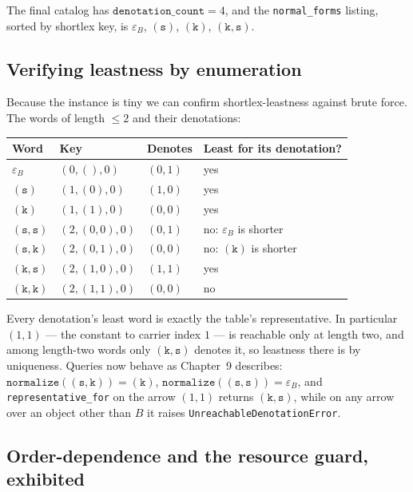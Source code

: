 The final catalog has $\texttt{denotation\_count} = 4$, and the
\texttt{normal\_forms} listing, sorted by shortlex key, is
$\varepsilon_B$, $(\texttt{s})$, $(\texttt{k})$,
$(\texttt{k},\texttt{s})$.

\subsection{Verifying leastness by enumeration}

Because the instance is tiny we can confirm shortlex-leastness against
brute force. The words of length $\le 2$ and their denotations:

\begin{center}
\begin{tabular}{@{}llll@{}}
\toprule
Word & Key & Denotes & Least for its denotation? \\
\midrule
$\varepsilon_B$ & $(0,(),0)$ & $(0,1)$ & yes \\
$(\texttt{s})$ & $(1,(0),0)$ & $(1,0)$ & yes \\
$(\texttt{k})$ & $(1,(1),0)$ & $(0,0)$ & yes \\
$(\texttt{s},\texttt{s})$ & $(2,(0,0),0)$ & $(0,1)$ & no: $\varepsilon_B$ is shorter \\
$(\texttt{s},\texttt{k})$ & $(2,(0,1),0)$ & $(0,0)$ & no: $(\texttt{k})$ is shorter \\
$(\texttt{k},\texttt{s})$ & $(2,(1,0),0)$ & $(1,1)$ & yes \\
$(\texttt{k},\texttt{k})$ & $(2,(1,1),0)$ & $(0,0)$ & no \\
\bottomrule
\end{tabular}
\end{center}

Every denotation's least word is exactly the table's representative.
In particular $(1,1)$ --- the constant to carrier index $1$ --- is
reachable only at length two, and among length-two words only
$(\texttt{k},\texttt{s})$ denotes it, so leastness there is by
uniqueness. Queries now behave as Chapter~9 describes:
$\texttt{normalize}((\texttt{s},\texttt{k})) = (\texttt{k})$,
$\texttt{normalize}((\texttt{s},\texttt{s})) = \varepsilon_B$, and
\texttt{representative\_for} on the arrow $(1,1)$ returns
$(\texttt{k},\texttt{s})$, while on any arrow over an object other
than $B$ it raises \texttt{UnreachableDenotationError}.

\subsection{Order-dependence and the resource guard, exhibited}


